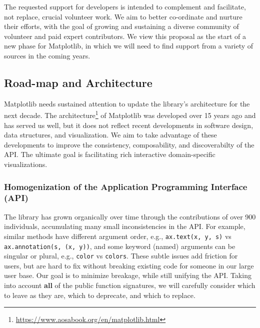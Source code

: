 \documentclass[11pt,letterpaper]{article}  %
\begin{document}
The requested support for developers is intended to complement and facilitate, not replace, crucial volunteer work. We aim to better co-ordinate and nurture their efforts, with the goal of growing and sustaining a diverse community of volunteer and paid expert contributors.
We view this proposal as the start of a new phase for Matplotlib, in which we will need to find support from a variety of sources in the coming years.



\subsection{Road-map and Architecture}
Matplotlib needs sustained attention to update the library's architecture for the next decade.
The architecture\footnote{\url{https://www.aosabook.org/en/matplotlib.html}} of Matplotlib was developed over 15 years ago \cite{Hunter:2007} and has served us well, but it does not reflect recent developments in software design, data structures, and visualization. We aim to take advantage of these developments to improve the consistency, composability, and discoverabilty of the API. The ultimate goal is facilitating rich interactive domain-specific visualizations.



\subsubsection{Homogenization of the Application Programming Interface (API)}
\label{sec:api_hom}
The library has grown organically over time through the contributions of over 900 individuals, accumulating many small inconsistencies in the API. For example, similar methods have different
argument order, e.g., \texttt{ax.text(x, y, s)} vs
\texttt{ax.annotation(s, (x, y))}, and some keyword (named) arguments can be
singular or plural, e.g., \texttt{color} vs \texttt{colors}.  These
subtle issues add friction for users, but are hard to fix without
breaking existing code for someone in our large user base.  Our goal is
to minimize breakage, while still unifying the API. Taking into account
\textbf{all} of the public function signatures, we will carefully consider which to leave as
they are, which to deprecate, and which to replace.
\end{document}

